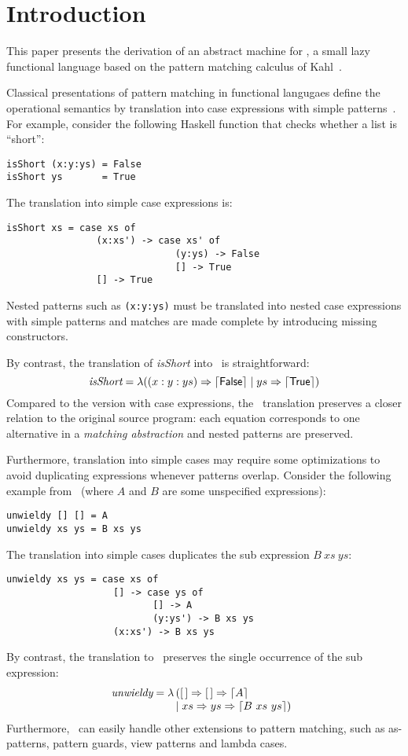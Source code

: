 \section{Introduction}\label{sec:intro}

This paper presents the derivation of an abstract machine for \lambdaPMC, a small
lazy functional language based on the pattern matching calculus
of Kahl~\cite{kahl_2004}.

Classical presentations of pattern matching in functional langugaes
define the operational semantics by translation
into case expressions with simple patterns~\cite{spj_1987,jones_1992}. For
example, consider the following Haskell function that checks whether a
list is ``short'':
\begin{verbatim}
isShort (x:y:ys) = False
isShort ys       = True
\end{verbatim}
The translation into simple case expressions is:
\begin{verbatim}
isShort xs = case xs of
                (x:xs') -> case xs' of
                              (y:ys) -> False
                              [] -> True
                [] -> True
\end{verbatim}
Nested patterns such as \verb|(x:y:ys)| must be translated into nested
case expressions with simple patterns and matches are made complete by
introducing missing constructors.  

By contrast, the translation of \textit{isShort} into \lambdaPMC\ is
straightforward:
\[ 
  \textit{isShort} = \lambda ((x:y:ys) \Rightarrow \left\lceil \textsf{False}\right\rceil \mid
  ys \Rightarrow \left\lceil \textsf{True}\right\rceil) 
\]
Compared to the version with case expressions, the \lambdaPMC\ translation
preserves a closer relation to the original source program: each
equation corresponds to one alternative in a \emph{matching
  abstraction} and nested patterns are preserved. 

Furthermore, translation into simple cases may require some
optimizations to avoid duplicating expressions whenever patterns
overlap. Consider the following example from~\cite{spj_1987} (where
$A$ and $B$ are some unspecified expressions):
\begin{verbatim}
unwieldy [] [] = A
unwieldy xs ys = B xs ys
\end{verbatim}
The translation into simple cases duplicates the sub expression $B~ xs~ ys$:
\begin{verbatim}
unwieldy xs ys = case xs of
                   [] -> case ys of
                          [] -> A
                          (y:ys') -> B xs ys
                   (x:xs') -> B xs ys
\end{verbatim}
By contrast, the translation to \lambdaPMC\ preserves the single occurrence of
the sub expression:
\[
  \textit{unwieldy} =
  \lambda\!\! \begin{array}[t]{l}
             ([\,] \Rightarrow [\,] \Rightarrow \left\lceil A\right\rceil \\
             \mid xs \Rightarrow ys \Rightarrow \left\lceil B~xs~ys\right\rceil)
             \end{array}
\]
Furthermore, \lambdaPMC\ can easily handle
other extensions to pattern matching, such as as-patterns, 
pattern guards, view patterns and lambda cases.

